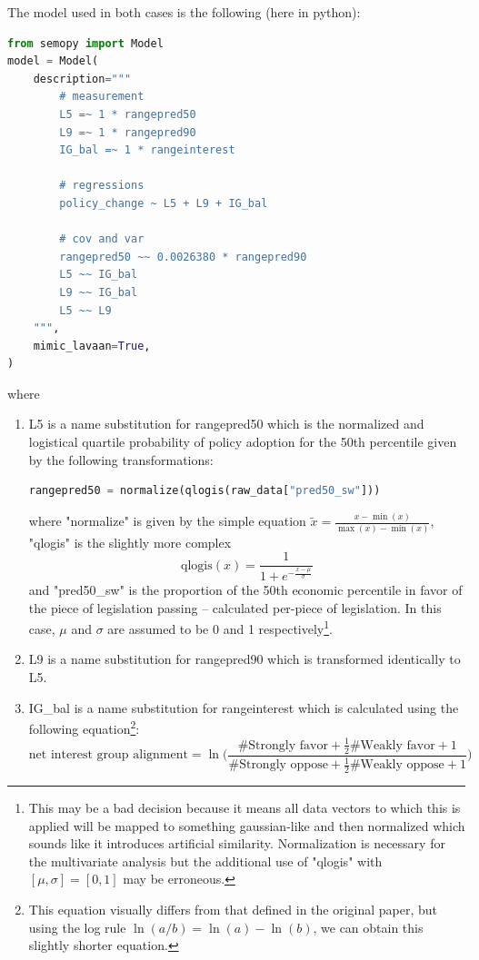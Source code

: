 \documentclass[]{article}
\begin{document}
The model used in both cases is the following (here in python):
\begin{lstlisting}[language=python,label=strict-model-definition,caption={SEM model with assumed, manual covariance between rangepred50 and rangepred90}]
from semopy import Model
model = Model(
	description="""
		# measurement
		L5 =~ 1 * rangepred50
		L9 =~ 1 * rangepred90
		IG_bal =~ 1 * rangeinterest
		
		# regressions
		policy_change ~ L5 + L9 + IG_bal
		
		# cov and var
		rangepred50 ~~ 0.0026380 * rangepred90
		L5 ~~ IG_bal
		L9 ~~ IG_bal
		L5 ~~ L9
	""",
	mimic_lavaan=True,
)	
\end{lstlisting}
where
\begin{enumerate}
	\item L5 is a name substitution for rangepred50 which is the normalized and logistical quartile probability of policy adoption for the 50th percentile given by the following transformations: 
	\begin{lstlisting}[language=python]
		rangepred50 = normalize(qlogis(raw_data["pred50_sw"]))
	\end{lstlisting}
	where "normalize" is given by the simple equation $\tilde{x} = \frac{x - \min(x)}{\max(x) - \min(x)}$, "qlogis" \cite{R-logistic} is the slightly more complex $$\text{qlogis}(x) = \frac{1}{1 + e^{-\frac{x - \mu}{\sigma}}}$$ and "pred50\_sw" is the proportion of the 50th economic percentile in favor of the piece of legislation passing -- calculated per-piece of legislation. In this case, $\mu$ and $\sigma$ are assumed to be 0 and 1 respectively\footnote{This may be a bad decision because it means all data vectors to which this is applied will be mapped to something gaussian-like and then normalized which sounds like it introduces artificial similarity. Normalization is necessary for the multivariate analysis but the additional use of "qlogis" with $[\mu, \sigma] = [0, 1]$ may be erroneous.}.
	\item L9 is a name substitution for rangepred90 which is transformed identically to L5.
	\item IG\_bal is a name substitution for rangeinterest which is calculated using the following equation\footnote{This equation visually differs from that defined in the original paper, but using the log rule $\ln(a/b) = \ln(a) - \ln(b)$, we can obtain this slightly shorter equation.}:
	\[\text{net interest group alignment} = \ln\Big(\frac{\text{\# Strongly favor} + \frac{1}{2} \text{\# Weakly favor} + 1}{\text{\# Strongly oppose} + \frac{1}{2} \text{\# Weakly oppose} + 1}\Big)\]

\end{enumerate}
\end{document}

